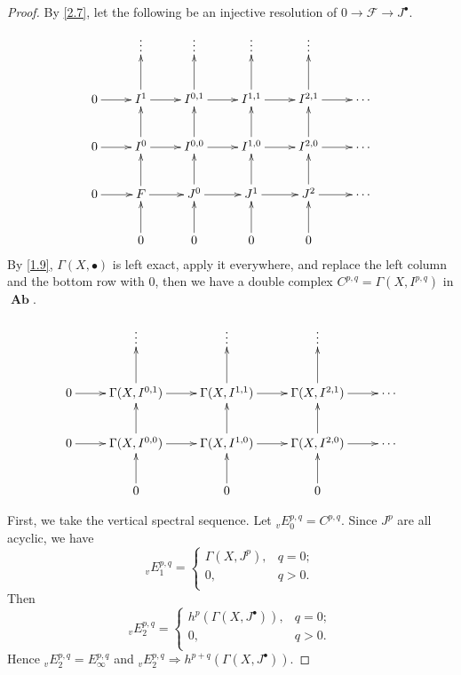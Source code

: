 \documentclass{amsart}
\numberwithin{equation}{section}
\theoremstyle{plain}
\theoremstyle{definition}
\DeclareMathOperator{\Ab}{\mathbf{Ab}}
\begin{document}
\begin{proof} 
	By \cref{2.7}, let the following be an injective resolution of $ 0\to \mathscr F\to J^{\bullet} $. 
	\[
	\xymatrix{
		&\vdots &\vdots &\vdots &\vdots &\\
		0\ar[r]& I^1 \ar[u]\ar[r]&I^{0,1} \ar[u]\ar[r]&I^{1,1} \ar[u]\ar[r]&I^{2,1} \ar[u]\ar[r]&\cdots\\
		0\ar[r]& I^0 \ar[u]\ar[r]&I^{0,0} \ar[u]\ar[r]&I^{1,0} \ar[u]\ar[r]&I^{2,0} \ar[u]\ar[r]&\cdots\\
		0\ar[r]& F \ar[u]\ar[r]&J^0 \ar[u]\ar[r]&J^1 \ar[u]\ar[r]&J^2 \ar[u]\ar[r]&\cdots\\
		& 0 \ar[u]&0\ar[u]&0 \ar[u]&0 \ar[u]&\\
		}
	\]
	By \cref{1.9}, $ \Gamma(X,\bullet) $ is left exact, apply it everywhere, and replace the left column and the bottom row with $ 0 $, then we have a double complex $ C^{p,q}=\Gamma(X, I^{p,q}) $ in $ \Ab $.
		
	\begin{equation}\label{double}
	\xymatrix{
		 &\vdots &\vdots &\vdots &\\
		 0\ar[r]&\Gamma(X,I^{0,1}) \ar[u]\ar[r]&\Gamma(X,I^{1,1}) \ar[u]\ar[r]&\Gamma(X,I^{2,1}) \ar[u]\ar[r]&\cdots\\
		 0\ar[r]&\Gamma(X,I^{0,0}) \ar[u]\ar[r]&\Gamma(X,I^{1,0}) \ar[u]\ar[r]&\Gamma(X,I^{2,0}) \ar[u]\ar[r]&\cdots\\
	&0\ar[u]&0 \ar[u]&0\ar[u]&\\
	}
	\end{equation}
	
	First, we take the vertical spectral sequence. 
	Let $ {_v}E_0^{p,q}=C^{p,q} $. 
	Since $ J^p $ are all acyclic, we have $$ {_v}E_1^{p,q}=\left\{
	\begin{array}{ll}
	\Gamma(X,J^p), &q=0;\\
	0,&q>0.\\
	\end{array}
	\right. $$
	Then $$ {_v}E_2^{p,q}=\left\{
	\begin{array}{ll}
	h^p(\Gamma(X,J^{\bullet})), &q=0;\\
	0,&q>0.\\
	\end{array}
	\right. $$
	Hence $ {_v}E_2^{p,q}=E_{\infty}^{p,q} $ and $ {_v}E_2^{p,q}\Rightarrow h^{p+q}(\Gamma(X,J^{\bullet}))$. 
	

\end{proof}
\end{document}
